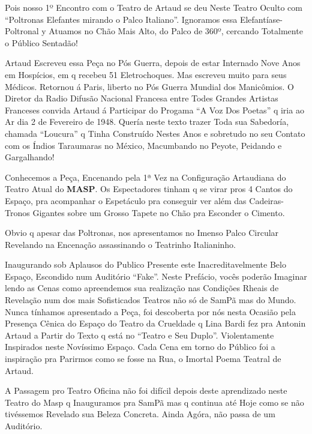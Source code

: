 Pois nosso 1º Encontro com o Teatro de Artaud se deu
Neste Teatro Oculto com ``Poltronas Elefantes mirando o Palco
Italiano''. Ignoramos essa Elefantíase-Poltronal y Atuamos no Chão Mais
Alto, do Palco de 360º, cercando Totalmente o Público Sentadão!

Artaud Escreveu essa Peça no Pós Guerra, depois de estar Internado
Nove Anos em Hospícios, em q recebeu 51 Eletrochoques. Mas escreveu
muito para seus Médicos. Retornou á Paris, liberto no Pós Guerra Mundial
dos Manicômios. O Diretor da Radio Difusão Nacional Francesa entre Todes
Grandes Artistas Franceses convida
Artaud á Participar do Progama ``A Voz Dos Poetas'' q iria ao Ar dia 2
de Fevereiro de 1948. Quería neste texto trazer Toda sua Sabedoría,
chamada ``Loucura'' q Tinha Construído Nestes Anos e sobretudo no seu
Contato com os Índios Taraumaras no México, Macumbando no Peyote, Peidando e Gargalhando!

Conhecemos a Peça, Encenando pela 1ª Vez na Configuração
Artaudiana do Teatro Atual do \textbf{MASP}. Os Espectadores tinham q se
virar pros 4 Cantos do Espaço, pra acompanhar o Espetáculo pra conseguir
ver além das Cadeiras-Tronos Gigantes sobre um Grosso Tapete no Chão pra
Esconder o Cimento.

Obvio q apesar das Poltronas, nos apresentamos no Imenso Palco
Circular Revelando na Encenação assassinando o Teatrinho Italianinho.

Inaugurando sob Aplausos do Publico Presente este
Inacreditavelmente Belo Espaço, Escondido num Auditório ``Fake''. Neste
Prefácio, vocês poderão Imaginar lendo as Cenas como apreendemos sua
realização nas Condições Rheais de Revelação num dos mais Sofisticados
Teatros não só de SamPã mas do Mundo. Nunca tínhamos apresentado a Peça,
foi descoberta por nós nesta Ocasião pela Presença Cênica do Espaço do
Teatro da Crueldade q Lina Bardi fez pra Antonin Artaud a Partir do
Texto q está no ``Teatro e Seu Duplo''. Violentamente Inspirados neste
Novíssimo Espaço. Cada Cena em torno do Público foi a inspiração pra
Parirmos como se fosse na Rua, o Imortal Poema Teatral de Artaud.

A Passagem pro Teatro Oficina não foi difícil depois deste
aprendizado neste Teatro do Masp q Inauguramos pra SamPã mas q continua
até Hoje como se não tivéssemos Revelado sua Beleza Concreta. Ainda
Agóra, não passa de um Auditório.

